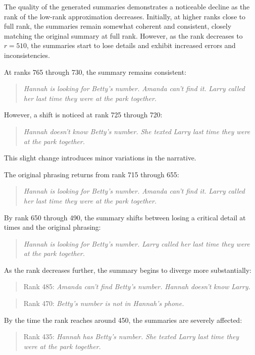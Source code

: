 The quality of the generated summaries demonstrates a noticeable decline as the rank of the low-rank approximation decreases. Initially, at higher ranks close to full rank, the summaries remain somewhat coherent and consistent, closely matching the original summary at full rank. However, as the rank decreases to \(r = 510\), the summaries start to lose details and exhibit increased errors and inconsistencies.

At ranks 765 through 730, the summary remains consistent:
\begin{quote}
    \textit{Hannah is looking for Betty's number. Amanda can't find it. Larry called her last time they were at the park together.}
\end{quote}

However, a shift is noticed at rank 725 through 720:
\begin{quote}
    \textit{Hannah doesn't know Betty's number. She texted Larry last time they were at the park together.}
\end{quote}

This slight change introduces minor variations in the narrative.

The original phrasing returns from rank 715 through 655:
\begin{quote}
    \textit{Hannah is looking for Betty's number. Amanda can't find it. Larry called her last time they were at the park together.}
\end{quote}

By rank 650 through 490, the summary shifts between losing a critical detail at times and the original phrasing:
\begin{quote}
    \textit{Hannah is looking for Betty's number. Larry called her last time they were at the park together.}
\end{quote}

As the rank decreases further, the summary begins to diverge more substantially:
\begin{quote}
    Rank 485: \textit{Amanda can't find Betty's number. Hannah doesn't know Larry.}
\end{quote}
\begin{quote}
    Rank 470: \textit{Betty's number is not in Hannah's phone.}
\end{quote}

By the time the rank reaches around 450, the summaries are severely affected:
\begin{quote}
    Rank 435: \textit{Hannah has Betty's number. She texted Larry last time they were at the park together.}
\end{quote}

